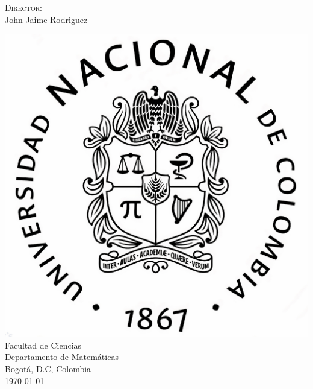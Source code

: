 \documentclass[12pt]{book}
\begin{document}
\renewcommand{\contentsname}{\vspace{0cm} Contenido \vspace{-2cm}}
\begin{titlepage}
\vspace*{2cm}
\noindent
{}

\vspace*{2cm}
\begin{minipage}{\linewidth}

\centering \scshape \printauthor
\vspace*{2cm}

\textsc{Director:}\\
\vspace{0.1cm}
John Jaime Rodriguez\\
\vspace{2.5cm}

\includegraphics[scale=0.1]{Logos/logo_un.jpg}\\
\fontsize{13pt}{13pt}\selectfont   Facultad de Ciencias\\
\vspace{0.1cm}
Departamento de Matemáticas\\
\vspace{0.1cm}
Bogotá, D.C, Colombia\\
\vspace{0.1cm}
\today
\end{minipage}
\end{titlepage}
\end{document}
